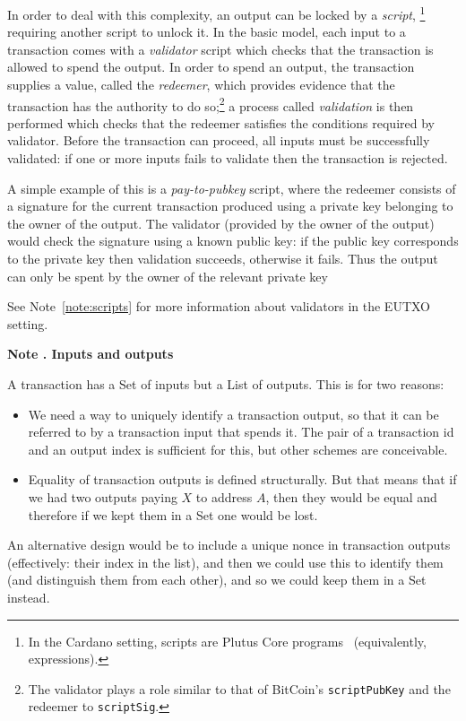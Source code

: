 \documentclass[a4paper]{article}
\newcounter{note}
\newcommand{\note}[1]{
  \bigskip
  \refstepcounter{note}
  \noindent\textbf{Note \thenote. #1}
}
\renewcommand{\i}{\textit}  %
\newcommand{\s}{\textsf}  %
\begin{document}
In order to deal with this complexity, an output can be locked by a
\textit{script},%
\footnote{In the Cardano setting, scripts are Plutus Core
  programs~\citep{Plutus-Core-spec} (equivalently, expressions).}
requiring another script to unlock it.  In the basic model, each input
to a transaction comes with a \i{validator} script which checks that
the transaction is allowed to spend the output.  In order to spend an
output, the transaction supplies a value, called the \i{redeemer},
which provides evidence that the transaction has the authority to do
so;\footnote{The validator plays a role similar to that of BitCoin's
  \texttt{scriptPubKey} and the redeemer to \texttt{scriptSig}.  } a
process called \i{validation} is then performed which checks that the
redeemer satisfies the conditions required by validator.  Before the
transaction can proceed, all inputs must be successfully validated: if
one or more inputs fails to validate then the transaction is rejected.

A simple example of this is a \i{pay-to-pubkey} script, where the
redeemer consists of a signature for the current transaction produced
using a private key belonging to the owner of the output.  The
validator (provided by the owner of the output) would check the
signature using a known public key: if the public key corresponds to
the private key then validation succeeds, otherwise it fails.  Thus
the output can only be spent by the owner of the relevant private key

See Note~\ref{note:scripts} for more information about validators in
the EUTXO setting.

\note{Inputs and outputs}
\label{note:inputs-and-outputs}
A transaction has a \textsf{Set} of inputs but a \textsf{List} of outputs.
This is for two reasons:
\begin{itemize}
  \item We need a way to uniquely identify a transaction output, so
  that it can be referred to by a transaction input that spends it. The pair of
  a transaction id and an output index is sufficient for this, but other schemes
  are conceivable.
  \item Equality of transaction outputs is defined structurally. But that means
    that if we had two outputs paying $X$ to address $A$, then they would be
    equal and therefore if we kept them in a \s{Set} one would be lost.
\end{itemize}

An alternative design would be to include a unique nonce in transaction outputs
(effectively: their index in the list), and then we could use this to identify
them (and distinguish them from each other), and so we could keep them in a \s{Set} instead.
\end{document}

